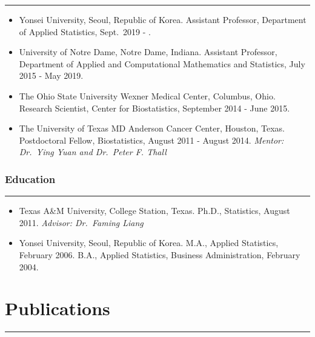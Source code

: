 \documentclass[
]{book}
\begin{document}
\begin{center}\rule{0.5\linewidth}{0.5pt}\end{center}

\begin{itemize}
\item
  Yonsei University, Seoul, Republic of Korea.
  Assistant Professor, Department of Applied Statistics, Sept.~2019 - .
\item
  University of Notre Dame, Notre Dame, Indiana.
  Assistant Professor, Department of Applied and Computational Mathematics and Statistics, July 2015 - May 2019.
\item
  The Ohio State University Wexner Medical Center, Columbus, Ohio.
  Research Scientist, Center for Biostatistics, September 2014 - June 2015.
\item
  The University of Texas MD Anderson Cancer Center, Houston, Texas.
  Postdoctoral Fellow, Biostatistics, August 2011 - August 2014.
  \emph{Mentor: Dr.~Ying Yuan and Dr.~Peter F. Thall}
\end{itemize}

\hypertarget{education}{%
\subsubsection*{Education}\label{education}}

\begin{center}\rule{0.5\linewidth}{0.5pt}\end{center}

\begin{itemize}
\item
  Texas A\&M University, College Station, Texas.
  Ph.D., Statistics, August 2011.
  \emph{Advisor: Dr.~Faming Liang}
\item
  Yonsei University, Seoul, Republic of Korea.
  M.A., Applied Statistics, February 2006.
  B.A., Applied Statistics, Business Administration, February 2004.
\end{itemize}

\hypertarget{publications}{%
\section*{Publications}\label{publications}}

\begin{center}\rule{0.5\linewidth}{0.5pt}\end{center}
\end{document}
